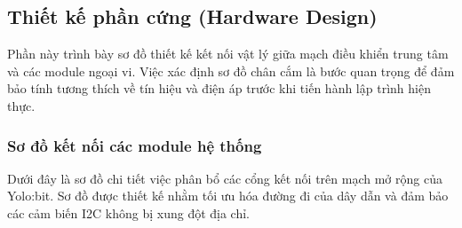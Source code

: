 
\subsection{Thiết kế phần cứng (Hardware Design)}

Phần này trình bày sơ đồ thiết kế kết nối vật lý giữa mạch điều khiển trung tâm và các module ngoại vi. Việc xác định sơ đồ chân cắm là bước quan trọng để đảm bảo tính tương thích về tín hiệu và điện áp trước khi tiến hành lập trình hiện thực.

\subsubsection{Sơ đồ kết nối các module hệ thống}

Dưới đây là sơ đồ chi tiết việc phân bổ các cổng kết nối trên mạch mở rộng của Yolo:bit. Sơ đồ được thiết kế nhằm tối ưu hóa đường đi của dây dẫn và đảm bảo các cảm biến I2C không bị xung đột địa chỉ.

